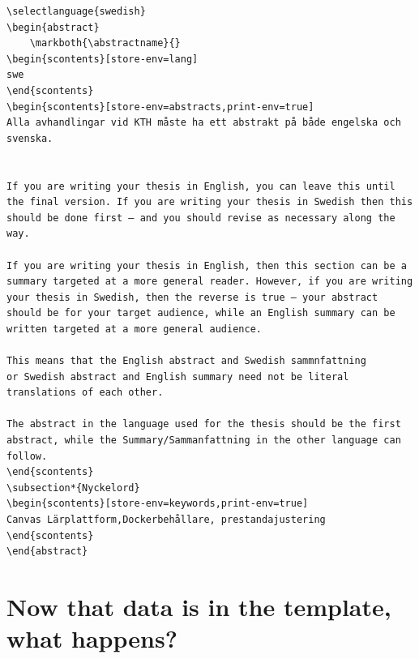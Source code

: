 \begin{lstlisting}[language={[LaTeX]TeX}, caption={\LaTeX~input to produce the Swedish abstract}, label=lst:SwedishAbstract] 
 \selectlanguage{swedish} 
\begin{abstract}
    \markboth{\abstractname}{}
\begin{scontents}[store-env=lang]
swe
\end{scontents}
\begin{scontents}[store-env=abstracts,print-env=true]
Alla avhandlingar vid KTH måste ha ett abstrakt på både engelska och svenska.


If you are writing your thesis in English, you can leave this until the final version. If you are writing your thesis in Swedish then this should be done first – and you should revise as necessary along the way.

If you are writing your thesis in English, then this section can be a summary targeted at a more general reader. However, if you are writing your thesis in Swedish, then the reverse is true – your abstract should be for your target audience, while an English summary can be written targeted at a more general audience.

This means that the English abstract and Swedish sammnfattning  
or Swedish abstract and English summary need not be literal translations of each other.

The abstract in the language used for the thesis should be the first abstract, while the Summary/Sammanfattning in the other language can follow.
\end{scontents}
\subsection*{Nyckelord}
\begin{scontents}[store-env=keywords,print-env=true]
Canvas Lärplattform,Dockerbehållare, prestandajustering
\end{scontents}
\end{abstract}
\end{lstlisting}


\clearpage
\section{Now that data is in the template, what happens?}
\label{sec:nowThatDataIsInTheTemplate}

